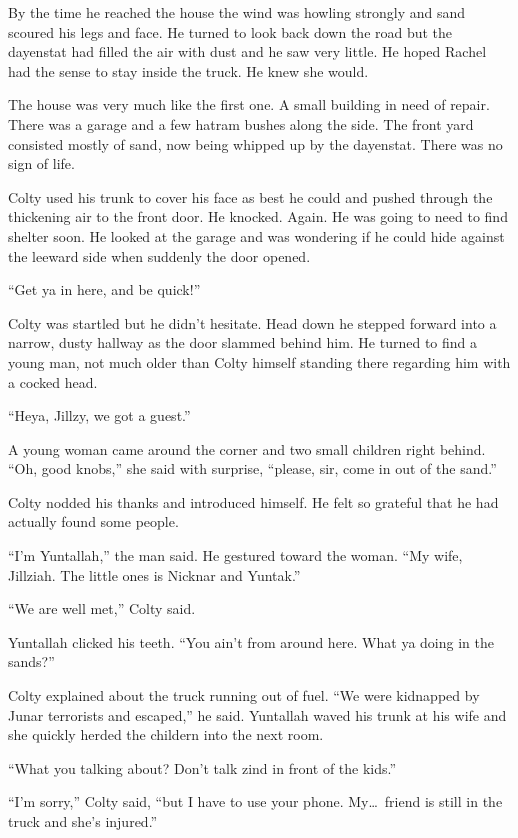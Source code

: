 By the time he reached the house the wind was howling strongly and sand scoured his legs and
face. He turned to look back down the road but the dayenstat had filled the air with dust and he
saw very little. He hoped Rachel had the sense to stay inside the truck. He knew she would.

The house was very much like the first one. A small building in need of repair. There was a
garage and a few hatram bushes along the side. The front yard consisted mostly of sand, now
being whipped up by the dayenstat. There was no sign of life.

Colty used his trunk to cover his face as best he could and pushed through the thickening air to
the front door. He knocked. Again. He was going to need to find shelter soon. He looked at the
garage and was wondering if he could hide against the leeward side when suddenly the door
opened.

``Get ya in here, and be quick!''

Colty was startled but he didn't hesitate. Head down he stepped forward into a narrow, dusty
hallway as the door slammed behind him. He turned to find a young man, not much older than Colty
himself standing there regarding him with a cocked head.

``Heya, Jillzy, we got a guest.''

A young woman came around the corner and two small children right behind. ``Oh, good knobs,''
she said with surprise, ``please, sir, come in out of the sand.''

Colty nodded his thanks and introduced himself. He felt so grateful that he had actually found
some people.

``I'm Yuntallah,'' the man said. He gestured toward the woman. ``My wife, Jillziah. The little
ones is Nicknar and Yuntak.''

``We are well met,'' Colty said.

Yuntallah clicked his teeth. ``You ain't from around here. What ya doing in the sands?''

Colty explained about the truck running out of fuel. ``We were kidnapped by Junar terrorists and
escaped,'' he said. Yuntallah waved his trunk at his wife and she quickly herded the childern
into the next room.

``What you talking about? Don't talk zind in front of the kids.''

``I'm sorry,'' Colty said, ``but I have to use your phone. My\ldots\ friend is still in the
truck and she's injured.''

